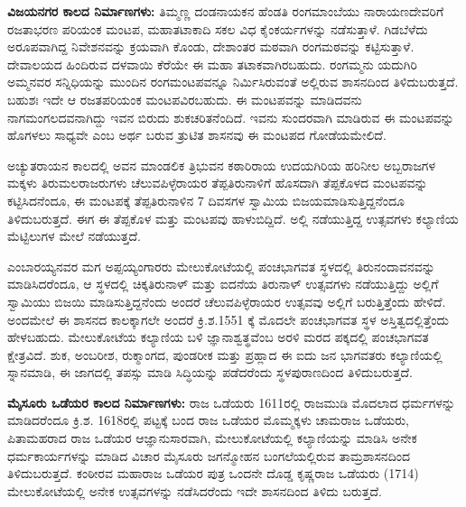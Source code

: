 \textbf{ವಿಜಯನಗರ ಕಾಲದ ನಿರ್ಮಾಣಗಳು:} ತಿಮ್ಮಣ್ಣ ದಂಡನಾಯಕನ ಹೆಂಡತಿ ರಂಗಮಾಂಬೆಯು ನಾರಾಯಣದೇವರಿಗೆ ರಜತಾಭರಣ ಪರಿಯಂಕ ಮಂಟಪ, ಮಹಾತಟಾಕಾದಿ ಸಕಲ ವಿಧ ಕೈಂಕರ್ಯಗಳನ್ನು ನಡೆಸುತ್ತಾಳೆ. ಗಿಡಬೆಳೆದು ಅರೂಪವಾಗಿದ್ದ ನಿವೇಶನವನ್ನು ಕ್ರಯವಾಗಿ ಕೊಂಡು, ದೇಶಾಂತರ ಮಠವಾಗಿ ರಂಗಮಠವನ್ನು ಕಟ್ಟಿಸುತ್ತಾಳೆ. ದೇವಾಲಯದ ಹಿಂದಿರುವ ದಳವಾಯಿ ಕೆರೆಯೇ ಈ ಮಹಾ ತಟಾಕವಾಗಿರಬಹುದು. ರಂಗಮ್ಮನು ಯದುಗಿರಿ ಅಮ್ಮನವರ ಸನ್ನಿಧಿಯನ್ನು ಮುಂದಿನ ರಂಗಮಂಟಪವನ್ನೂ ನಿರ್ಮಿಸಿರುವಂತೆ ಅಲ್ಲಿರುವ ಶಾಸನದಿಂದ ತಿಳಿದುಬರುತ್ತದೆ. ಬಹುಶಃ ಇದೇ ಆ ರಜತಪರಿಯಂಕ ಮಂಟಪವಿರಬಹುದು. ಈ ಮಂಟಪವನ್ನು ಮಾಡಿದವನು ನಾಗಮಂಗಲದವನಾಗಿದ್ದು ಇವನ ಬಿರುದು ಶುಕಚರಿತನೆಂದಿದೆ. ಇವನು ಸುಂದರವಾಗಿ ಮಾಡಿರುವ ಈ ಮಂಟಪವನ್ನು ಹೊಗಳಲು ಸಾಧ್ಯವೇ ಎಂಬ ಅರ್ಥ ಬರುವ ತ್ರುಟಿತ ಶಾಸನವು ಈ ಮಂಟಪದ ಗೋಡೆಯಮೇಲಿದೆ.

ಅಚ್ಯುತರಾಯನ ಕಾಲದಲ್ಲಿ ಅವನ ಮಾಂಡಲಿಕ ತ್ರಿಭುವನ ಕಠಾರಿರಾಯ ಉದಯಗಿರಿಯ ಹರಿನೀಲ ಅಬ್ಬರಾಜಗಳ ಮಕ್ಕಳು ತಿರುಮಲರಾಜರುಗಳು ಚೆಲುವಪಿಳ್ಳೆರಾಯರ ತೆಪ್ಪತಿರುನಾಳಿಗೆ ಹೊಸದಾಗಿ ತೆಪ್ಪಕೊಳದ ಮಂಟಪವನ್ನು ಕಟ್ಟಿಸಿದನೆಂದೂ, ಈ ಮಂಟಪಕ್ಕೆ ತೆಪ್ಪತಿರುನಾಳಿನ 7 ದಿವಸಗಳ ಸ್ವಾಮಿಯ ಬಿಜಯಮಾಡಿಸುತ್ತಿದ್ದನೆಂದೂ ತಿಳಿದುಬರುತ್ತದೆ. ಈಗ ಈ ತೆಪ್ಪಕೊಳ ಮತ್ತು ಮಂಟಪವು ಹಾಳುಬಿದ್ದಿದೆ. ಅಲ್ಲಿ ನಡೆಯುತ್ತಿದ್ದ ಉತ್ಸವಗಳು ಕಲ್ಯಾಣಿಯ ಮೆಟ್ಟಿಲುಗಳ ಮೇಲೆ ನಡೆಯುತ್ತದೆ.

ಎಂಬಾರಯ್ಯನವರ ಮಗ ಅಪ್ಪಯ್ಯಂಗಾರರು ಮೇಲುಕೋಟೆಯಲ್ಲಿ ಪಂಚಭಾಗವತ ಸ್ಥಳದಲ್ಲಿ ತಿರುನಂದಾವನವನ್ನು ಮಾಡಿಸಿದರೆಂದೂ, ಆ ಸ್ಥಳದಲ್ಲಿ ಚಿಕ್ಕತಿರುನಾಳ್​ ಮತ್ತು ಐದನೆಯ ತಿರುನಾಳ್​ ಉತ್ಸವಗಳು ನಡೆಯುತ್ತಿದ್ದು ಅಲ್ಲಿಗೆ ಸ್ವಾಮಿಯು ಬಿಜಯಿ ಮಾಡಿಸುತ್ತಿದ್ದನೆಂದು ಅಂದರೆ ಚೆಲುವಪಿಳ್ಳೆರಾಯರ ಉತ್ಸವವು ಅಲ್ಲಿಗೆ ಬರುತ್ತಿತ್ತೆಂದು ಹೇಳಿದೆ. ಅಂದಮೇಲೆ ಈ ಶಾಸನದ ಕಾಲಕ್ಕಾಗಲೇ ಅಂದರೆ ಕ್ರಿ.ಶ.1551 ಕ್ಕೆ ಮೊದಲೇ ಪಂಚಭಾಗವತ ಸ್ಥಳ ಅಸ್ತಿತ್ವದಲ್ಲಿತ್ತೆಂದು ಹೇಳಬಹುದು. ಮೇಲುಕೋಟೆಯ ಕಲ್ಯಾಣಿಯ ಬಳಿ ಜ್ಞಾನಾಶ್ವತ್ಥವೆಂಬ ಅರಳಿ ಮರದ ಪಕ್ಕದಲ್ಲಿ ಪಂಚಭಾಗವತ ಕ್ಷೇತ್ರವಿದೆ. ಶುಕ, ಅಂಬರೀಶ, ರುಕ್ಮಾಂಗದ, ಪುಂಡರೀಕ ಮತ್ತು ಪ್ರಹ್ಲಾದ ಈ ಐದು ಜನ ಭಾಗವತರು ಕಲ್ಯಾಣಿಯಲ್ಲಿ ಸ್ನಾನಮಾಡಿ, ಈ ಜಾಗದಲ್ಲಿ ತಪಸ್ಸು ಮಾಡಿ ಸಿದ್ಧಿಯನ್ನು ಪಡೆದರೆಂದು ಸ್ಥಳಪುರಾಣದಿಂದ ತಿಳಿದುಬರುತ್ತದೆ.

\newpage

\textbf{ಮೈಸೂರು ಒಡೆಯರ ಕಾಲದ ನಿರ್ಮಾಣಗಳು:} ರಾಜ ಒಡೆಯರು 1611ರಲ್ಲಿ ರಾಜಮುಡಿ ಮೊದಲಾದ ಧರ್ಮಗಳನ್ನು ಮಾಡಿದರೆಂದೂ ಕ್ರಿ.ಶ. 1618ರಲ್ಲಿ ಪಟ್ಟಕ್ಕೆ ಬಂದ ರಾಜ ಒಡೆಯರ ಮೊಮ್ಮಕ್ಕಳು ಚಾಮರಾಜ ಒಡೆಯರು, ಪಿತಾಮಹರಾದ ರಾಜ ಒಡೆಯರ ಆಜ್ಞಾನುಸಾರವಾಗಿ, ಮೇಲುಕೋಟೆಯಲ್ಲಿ ಕಲ್ಯಾಣಿಯನ್ನು ಮಾಡಿಸಿ ಅನೇಕ ಧರ್ಮಕಾರ್ಯ\-ಗಳನ್ನು ಮಾಡಿದ ವಿಚಾರ ಮೈಸೂರು ಜಗನ್ಮೋಹನ ಬಂಗಲೆಯಲ್ಲಿರುವ ತಾಮ್ರಶಾಸನದಿಂದ ತಿಳಿದುಬರುತ್ತದೆ. ಕಂಠೀರವ ಮಹಾರಾಜ ಒಡೆಯರ ಪುತ್ರ ಒಂದನೇ ದೊಡ್ಡ ಕೃಷ್ಣರಾಜ ಒಡೆಯರು (1714) ಮೇಲುಕೋಟೆಯಲ್ಲಿ ಅನೇಕ ಉತ್ಸವಗಳನ್ನು ನಡೆಸಿದರೆಂದು ಇದೇ ಶಾಸನದಿಂದ ತಿಳಿದು ಬರುತ್ತದೆ.

